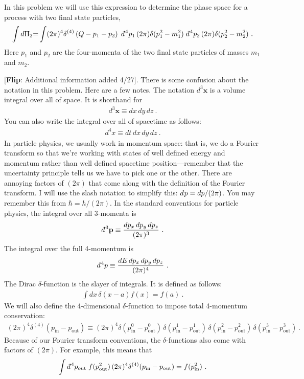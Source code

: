 \documentclass[12pt]{article}
\renewcommand{\vec}[1]{\mathbf{#1}} %
\newcommand{\dbar}{d\mkern-6mu\mathchar'26\hspace{-.1em}}    %
\newcommand{\flip}[1]{{\color{red} [\textbf{Flip}: {#1}]}}
\begin{document}
In this problem we will use this expression to determine the phase space for a process with two final state particles,
\begin{align}
	\int d\Pi_2 {=} 
	\int (2\pi)^4 \delta^{(4)}\left(Q-p_1-p_2\right) 
	\;
	\dbar^4 p_1\, (2\pi)\delta(p_1^2 - m_1^2) 
	\;
	\dbar^4 p_2\, (2\pi)\delta(p_2^2 - m_2^2)
	\ .
\end{align}
Here $p_1$ and $p_2$ are the four-momenta of the two final state particles of masses $m_1$ and $m_2$.

\begin{framed}
\flip{Additional information added 4/27}. There is some confusion about the notation in this problem. Here are a few notes. The notation $d^3\vec{x}$ is a volume integral over all of space. It is shorthand for
\begin{align}
	d^3\vec{x} \equiv dx\,dy\,dz \ .
\end{align}
You can also write the integral over all of spacetime as follows:
\begin{align}
	d^4x \equiv dt\,dx\,dy\,dz \ .
\end{align}
In particle physics, we usually work in momentum space: that is, we do a Fourier transform so that we're working with states of well defined energy and momentum rather than well defined spacetime position---remember that the uncertainty principle tells us we have to pick one or the other. There are annoying factors of $(2\pi)$ that come along with the definition of the Fourier transform. I will use the slash notation to simplify this: $\dbar p = dp/(2\pi)$. You may remember this from $\hbar =h/(2\pi)$. In the standard conventions for particle physics, the integral over all 3-momenta is
\begin{align}
	\dbar^3\vec{p} \equiv \frac{dp_x \,dp_y\,dp_z}{(2\pi)^3} \ .
\end{align}
The integral over the full 4-momentum is
\begin{align}
	\dbar^4{p} \equiv \frac{dE\,dp_x \,dp_y\,dp_z}{(2\pi)^4} \ .
\end{align}
The Dirac $\delta$-function is the slayer of integrals. It is defined as follows:
\begin{align}
	\int dx\, \delta(x-a) f(x) = f(a) \ .
\end{align}
We will also define the 4-dimensional $\delta$-function to impose total 4-momentum conservation:
\begin{align}
	(2\pi)^4
	\delta^{(4)}(p_\text{in}-p_\text{out}) \equiv
	(2\pi)^4
	\delta(p_\text{in}^0-p_\text{out}^0)\,
	\delta(p_\text{in}^1-p_\text{out}^1)\,
	\delta(p_\text{in}^2-p_\text{out}^2)\,
	\delta(p_\text{in}^3-p_\text{out}^3)\, .
\end{align}
Because of our Fourier transform conventions, the $\delta$-functions also come with factors of $(2\pi)$. For example, this means that
\begin{align}
	\int \dbar^4 p_\text{out}\; f(p_\text{out}^2)\, (2\pi)^4 \delta^{(4)}(p_\text{in}-p_\text{out})
	= f(p_\text{in}^2) \ .
\end{align}

\end{framed}
\end{document}
